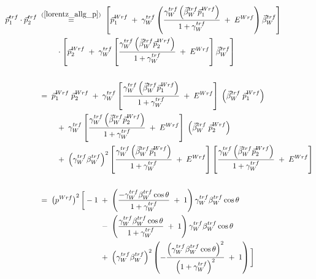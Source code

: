 \documentclass[
a4paper,                                %
twoside,                                %
BCOR1.4cm,                      %
ngerman,                                %
10pt,                           %
headings=normal,                %
headsepline,                    %
clearplainpage, %
final,                                  %
div=14,
parskip=full
]{scrbook}
\begin{document}
\begin{align}
	\vec{p}_{1}^{trf} \cdot \vec{p}_{2}^{trf}
\;&\stackrel{\mathrm{(\ref{lorentz_allg_p})}}=\;
	\left[
		\vec{p}_{1}^{Wrf}\;+\;\gamma_{W}^{trf} 
		\left(
			\dfrac{\gamma_{W}^{trf} 
			\left(\vec{\beta}_{W}^{trf} \vec{p}_{1}^{Wrf}\right)}
			{1+\gamma_{W}^{trf}}\;+\;E^{Wrf}
		\right) \vec{\beta}_{W}^{trf}
	\right] 
\nonumber
\\
&\qquad\;\cdot \left[
		\vec{p}_{2}^{Wrf}\;+\;\gamma_{W}^{trf} 
		\left[
			\dfrac{\gamma_{W}^{trf} 
			\left(\vec{\beta}_{W}^{trf}\vec{p}_{2}^{Wrf}\right)}
			{1+\gamma_{W}^{trf}}\;+\;E^{Wrf}
		\right] \vec{\beta}_{W}^{trf}
	\right]
\nonumber
\\
\nonumber
\\
\;&=\;
	\vec{p}_{1}^{Wrf}\;\vec{p}_{2}^{Wrf}
	\;+\;\gamma_{W}^{trf} \left[
		\dfrac{\gamma_{W}^{trf} 
		\left(\vec{\beta}_{W}^{trf} \vec{p}_{1}^{Wrf}\right) }
		{1+\gamma_{W}^{trf}}\;+\;E^{Wrf}	
	\right]\;\left(\vec{\beta}_{W}^{trf}\;\vec{p}_{1}^{Wrf}\right)
\nonumber
\\	
	&\qquad\;+\;\gamma_{W}^{trf} \left[
		\dfrac{\gamma_{W}^{trf} 
		\left(\vec{\beta}_{W}^{trf} \vec{p}_{2}^{Wrf}\right) }
		{1+\gamma_{W}^{trf}}\;+\;E^{Wrf}	
	\right]\;\left(\vec{\beta}_{W}^{trf}\;\vec{p}_{2}^{Wrf}\right)
\nonumber
\\	
	&\qquad\;+\;\left(\gamma_{W}^{trf} \beta_{W}^{trf}\right)^{2} \left[
			\dfrac{\gamma_{W}^{trf} 
			\left(\vec{\beta}_{W}^{trf} \vec{p}_{1}^{Wrf}\right) }
			{1+\gamma_{W}^{trf}}\;+\;E^{Wrf}	
		\right]
		\left[
				\dfrac{\gamma_{W}^{trf} 
				\left(\vec{\beta}_{W}^{trf} \vec{p}_{2}^{Wrf}\right) }
				{1+\gamma_{W}^{trf}}\;+\;E^{Wrf}	
		\right]
\nonumber
\\
\nonumber
\\
\;&=\;
	\left(p^{Wrf}\right)^{2}\bigg[
		-1\;+\;
		\left(\dfrac{-\gamma_{W}^{trf} \beta_{W}^{trf} \cos \theta}
		{1 + \gamma_{W}^{trf}}\;+\;1\right) 
		\gamma_{W}^{trf} \beta_{W}^{trf} \cos \theta
\nonumber
\\	
&\qquad\qquad\qquad\;\;\;\;\;\;\;-\;
		\left(\dfrac{\gamma_{W}^{trf} \beta_{W}^{trf} \cos \theta}
		{1 + \gamma_{W}^{trf}}\;+\;1\right) 
		\gamma_{W}^{trf} \beta_{W}^{trf} \cos \theta
\nonumber
\\	
&\qquad\qquad\qquad\;\;\;\;\;\;\;+\;
		\left(\gamma_{W}^{trf} \beta_{W}^{trf}\right)^{2} 
		\left(-\dfrac{\left(\gamma_{W}^{trf} 
		\beta_{W}^{trf} \cos \theta \right)^{2}}
		{\left(1 + \gamma_{W}^{trf}\right)^{2}}\;+\;1\right)
	\bigg]
\nonumber
\\
\nonumber
\\

\end{align}
\end{document}
